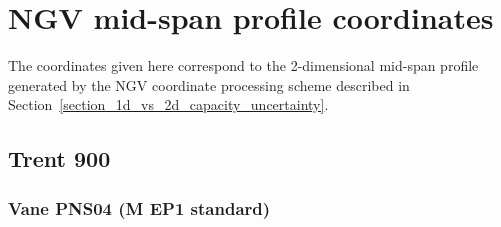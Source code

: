 \documentclass[a4paper, 11pt, oneside]{report}
\begin{document}
\chapter{NGV mid-span profile coordinates}

The coordinates given here correspond to the 2-dimensional mid-span profile generated by the NGV coordinate processing scheme described in Section~\ref{section_1d_vs_2d_capacity_uncertainty}.

\newsavebox\ltmcbox


\section{Trent 900} \label{coordinates_t900}

\subsection{Vane PNS04 (M EP1 standard)}
\end{document}
